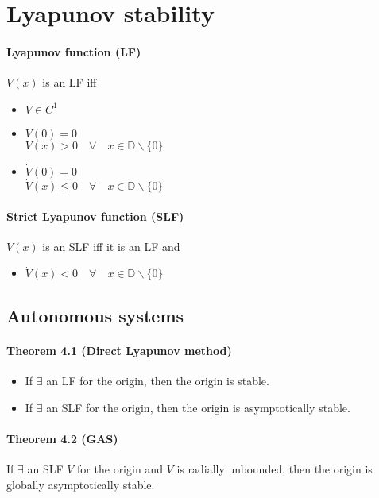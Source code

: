 \section{Lyapunov stability}

\paragraph{Lyapunov function (LF)}
$V(x)$ is an LF iff
\begin{itemize}
	\item $V \in C^1$
	\item $V(0) = 0$ \\
	      $V(x) > 0 \quad \forall \quad x \in \mathbb{D} \backslash \{0\}$
	\item $\dot{V}(0) = 0$ \\
	      $\dot{V}(x) \leq 0 \quad \forall \quad x \in \mathbb{D} \backslash \{0\}$
\end{itemize}

\paragraph{Strict Lyapunov function (SLF)}
$V(x)$ is an SLF iff it is an LF and
\begin{itemize}
	\item $\dot{V}(x) < 0 \quad \forall \quad x \in \mathbb{D} \backslash \{0\}$
\end{itemize}

\subsection{Autonomous systems}
\paragraph{Theorem 4.1 (Direct Lyapunov method)}
\begin{itemize}
	\item If $\exists$ an LF for the origin, then the origin is stable.
	\item If $\exists$ an SLF for the origin, then the origin is asymptotically stable.
\end{itemize}

\paragraph{Theorem 4.2 (GAS)}
If $\exists$ an SLF $V$ for the origin and $V$ is radially unbounded, then the origin is globally asymptotically stable.

